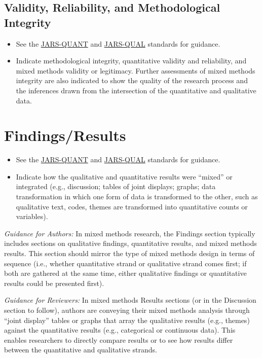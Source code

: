\documentclass[acmsmall,screen,anonymous,review]{acmart}
\begin{document}
\subsection{Validity, Reliability, and Methodological Integrity}
\begin{itemize}
\item See the \href{https://apastyle.apa.org/jars/quantitative}{JARS-QUANT} and \href{https://apastyle.apa.org/jars/qualitative}{JARS-QUAL} standards for guidance. 
\item Indicate methodological integrity, quantitative validity and reliability, and mixed methods validity or legitimacy. Further assessments of mixed methods integrity are also indicated to show the quality of the research process and the inferences drawn from the intersection of the quantitative and qualitative data.
\end{itemize}

\section{Findings/Results}
\begin{itemize}
\item See the \href{https://apastyle.apa.org/jars/quantitative}{JARS-QUANT} and \href{https://apastyle.apa.org/jars/qualitative}{JARS-QUAL} standards for guidance.
\item Indicate how the qualitative and quantitative results were “mixed” or integrated (e.g., discussion; tables of joint displays; graphs; data transformation in which one form of data is transformed to the other, such as qualitative text, codes, themes are transformed into quantitative counts or variables). 
\end{itemize}

\textit{Guidance for Authors:}  In mixed methods research, the Findings section typically includes sections on qualitative findings, quantitative results, and mixed methods results. This section should mirror the type of mixed methods design in terms of sequence (i.e., whether quantitative strand or qualitative strand comes first; if both are gathered at the same time, either qualitative findings or quantitative results could be presented first). 

\textit{Guidance for Reviewers:} In mixed methods Results sections (or in the Discussion section to follow), authors are conveying their mixed methods analysis through “joint display” tables or graphs that array the qualitative results (e.g., themes) against the quantitative results (e.g., categorical or continuous data). This enables researchers to directly compare results or to see how results differ between the quantitative and qualitative strands.
\end{document}
